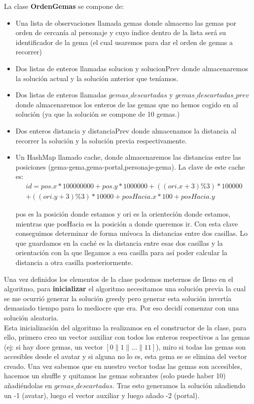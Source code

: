 \documentclass[a4paper,11pt]{article}
\begin{document}
La clase \textbf{OrdenGemas} se compone de:
\begin{itemize}
\item Una lista de observaciones llamada gemas donde almaceno las gemas por orden de cercanía al personaje y cuyo índice dentro de la lista será su identificador de la gema (el cual usaremos para dar el orden de gemas a recorrer)
\item Dos listas de enteros llamadas solucion y solucionPrev donde almacenaremos la solución actual y la solución anterior que teníamos.
\item Dos listas de enteros llamadas $gemas\_descartadas$ y $gemas\_descartadas\_prev$ donde almacenaremos los enteros de las gemas que no hemos cogido en al solución (ya que la solución se compone de 10 gemas.)
\item Dos enteros distancia y distanciaPrev donde almacenamos la distancia al recorrer la solución y la solución previa respectivamente.
\item Un HashMap llamado cache, donde almacenaremos las distancias entre las posiciones (gema-gema,gema-portal,personaje-gema). La clave de este cache es:
\begin{align*}
id=pos.x*100000000+pos.y*1000000+((ori.x+3)\%3)*100000\\+((ori.y+3)\%3)*10000+posHacia.x*100+posHacia.y
\end{align*}

pos es la posición donde estamos y ori es la orienteción donde estamos, mientras que posHacia es la posición a donde queremos ir. Con esta clave conseguimos determinar de forma unívoca la distancias entre dos casillas. Lo que guardamos en la caché es la distancia entre esas dos casillas y la orientación con la que llegamos a esa casilla para así poder calcular la distancia a otra casilla posteriormente.
\end{itemize}

Una vez definidos los elementos de la clase podemos meternos de lleno en el algoritmo, para \textbf{inicializar} el algoritmo necesitamos una solución previa la cual se me ocurrió generar la solución greedy pero generar esta solución invertía demasiado tiempo para lo mediocre que era. Por eso decidí comenzar con una solución aleatoria.\\

Esta inicialización del algoritmo la realizamos en el constructor de la clase, para ello, primero creo un vector auxiliar con todos los enteros respectivos a las gemas (ej: si hay doce gemas, un vector $[0\|1\|...\|11]$), miro si todas las gemas son accesibles desde el avatar y si alguna no lo es, esta gema se se elimina del vector creado. Una vez sabemos que en nuestro vector todas las gemas son accesibles, hacemos un shuffle y quitamos las gemas sobrantes (solo puede haber 10) añadiéndolas en $gemas\_descartadas$. Tras esto generamos la solución añadiendo un -1 (avatar), luego el vector auxiliar y luego añado -2 (portal).\\ 
\end{document}
